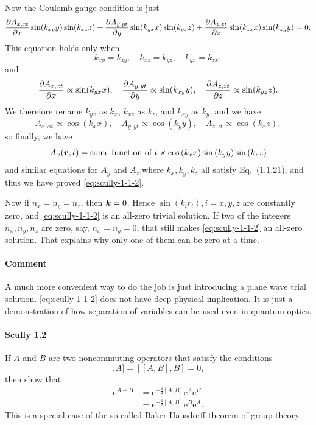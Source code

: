 \documentclass[hyperref, a4paper]{article}
\newcommand*{\ee}{\mathrm{e}}
\begin{document}
Now the Coulomb gauge condition is just
\[
    \pdv{A_{x, xt}}{x} \sin(k_{xy} y) \sin(k_{xz} z) + \pdv{A_{y, yt}}{y} \sin(k_{yx} x) \sin(k_{yz} z) + \pdv{A_{z, zt}}{z} \sin(k_{zx} x) \sin(k_{zy} y) = 0.
\]
This equation holds only when
\[
    k_{xy} = k_{zy}, \quad k_{xz} = k_{yz}, \quad k_{yx} = k_{zx},
\]
and
\[
    \pdv{A_{x, xt}}{x} \propto \sin(k_{yx} x), \quad \pdv{A_{y, yt}}{y} \propto \sin(k_{xy} y) , \quad \pdv{A_{z, zt}}{z} \propto \sin(k_{yz} z).
\]
We therefore rename $k_{yx}$ as $k_x$, $k_{xz}$ as $k_z$, and $k_{xy}$ as $k_y$, and we have
\[
    A_{x, xt} \propto \cos(k_x x), \quad A_{y, yt} \propto \cos(k_y y), \quad A_{z, zt} \propto \cos(k_x z),
\]
so finally, we have 
\[
    A_x(\vb*{r}, t) = \text{some function of $t$} \times \cos \left(k_{x} x\right) \sin \left(k_{y} y\right) \sin \left(k_{z} z\right)
\]
and similar equations for $A_y$ and $A_z$,where $k_x, k_y, k_z$ all satisfy Eq.~(1.1.21), and thus we have proved \eqref{eq:scully-1-1-2}.

Now if $n_x = n_y = n_z$, then $\vb*{k} = 0$. Hence $\sin(k_i r_i), i = x, y, z$ are constantly zero, and \eqref{eq:scully-1-1-2} is an all-zero trivial solution.
If two of the integers $n_x, n_y, n_z$ are zero, say, $n_x = n_y = 0$, that still makes \eqref{eq:scully-1-1-2} an all-zero solution.
That explains why only one of them can be zero at a time.

\paragraph{Comment} A much more convenient way to do the job is just introducing a plane wave trial solution.
\eqref{eq:scully-1-1-2} does not have deep physical implication. It is just a demonstration of how separation of variables can be used even in quantum optics.

\paragraph{}

\paragraph{Scully 1.2} If $A$ and $B$ are two noncommuting operators that satisfy the conditions
\begin{equation}
    [[A, B], A]=[[A, B], B]=0,
    \label{eq:scully-1-2-1}
\end{equation}
then show that
\begin{equation}
    \begin{aligned}
        \ee^{A+B} &= \ee^{-\frac{1}{2}[A, B]} \ee^{A} \ee^{B} \\
        &= \ee^{+\frac{1}{2}[A, B]} \ee^{B} \ee^{A}.
    \end{aligned}
    \label{eq:scully-1-2-2}    
\end{equation}
This is a special case of the so-called Baker-Hausdorff theorem of group theory.
\end{document}
